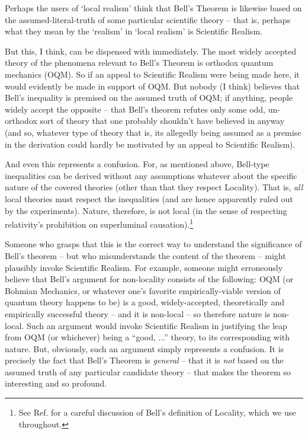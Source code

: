 \documentclass[12pt]{article}
\begin{document}
Perhaps the users of `local realism' think that Bell's Theorem is
likewise based on the assumed-literal-truth of some particular 
scientific theory
-- that is, perhaps what they mean by the `realism' in `local
realism' is Scientific Realism.

But this, I think, can be dispensed with immediately.  The most widely
accepted theory of the phenomena relevant to Bell's Theorem is
orthodox quantum mechanics (OQM).  
So if an appeal to Scientific Realism were
being made here, it would evidently be made in support of OQM.
But nobody (I think) believes that Bell's inequality is premised on the
assumed truth of OQM; if anything, people widely
accept the opposite -- that Bell's theorem refutes only some odd,
un-orthodox sort of theory that one probably shouldn't have believed
in anyway (and so, whatever type of theory that is, its allegedly being assumed
as a premise in the derivation could hardly be motivated by an appeal
to Scientific Realism).  

And even this represents a confusion.  For, as mentioned above,
Bell-type inequalities can be derived without any assumptions whatever
about the specific nature of the covered theories (other than that
they respect Locality).  That is, \emph{all} local theories must
respect the inequalities (and are hence apparently
ruled out by the experiments).  
Nature, therefore, is not local (in the sense of respecting relativity's
prohibition on superluminal causation).\footnote{See
  Ref. \cite{nonlocchar} for a careful discussion of Bell's definition
  of Locality, which we use throughout.}

Someone who grasps that this is the correct way to understand the
significance of Bell's theorem -- but who misunderstands the content
of the theorem -- might plausibly invoke Scientific Realism.  For
example, someone might erroneously believe that Bell's argument for
non-locality consists of the following:  OQM (or
Bohmian Mechanics, or whatever one's favorite empirically-viable
version of quantum theory happens to be) is a good, widely-accepted,
theoretically and empirically successful theory -- and it is
non-local -- so therefore nature is non-local.  Such an argument would
invoke Scientific Realism in justifying the leap from OQM (or
whichever) being a ``good, ...'' theory, to its corresponding with
nature.  But, obviously, such an argument simply represents a 
confusion.  It is precisely the fact that Bell's Theorem is
\emph{general} -- that it is \emph{not} based on the assumed truth of 
any particular candidate theory -- that makes the theorem so
interesting and so profound.
\end{document}
